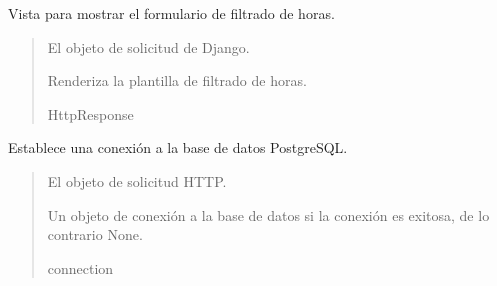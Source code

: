\documentclass[letterpaper,10pt,spanish]{sphinxmanual}
\begin{document}
\begin{fulllineitems}

\pysigstartsignatures
{}
\pysigstopsignatures
\sphinxAtStartPar
Vista para mostrar el formulario de filtrado de horas.
\begin{quote}\begin{description}
\sphinxAtStartPar
{} \textendash{} El objeto de solicitud de Django.

\sphinxAtStartPar
Renderiza la plantilla de filtrado de horas.

\sphinxAtStartPar
HttpResponse

\end{description}\end{quote}

\end{fulllineitems}



\begin{fulllineitems}

\pysigstartsignatures
{}
\pysigstopsignatures
\sphinxAtStartPar
Establece una conexión a la base de datos PostgreSQL.
\begin{quote}\begin{description}
\sphinxAtStartPar
{} \textendash{} El objeto de solicitud HTTP.

\sphinxAtStartPar
Un objeto de conexión a la base de datos si la conexión es exitosa, de lo contrario None.

\sphinxAtStartPar
connection

\end{description}\end{quote}

\end{fulllineitems}
\end{document}
